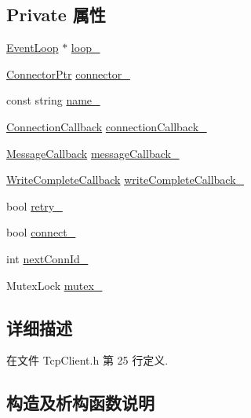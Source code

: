 \subsection*{Private 属性}
\begin{DoxyCompactItemize}
\item 
\hyperlink{classmuduo_1_1net_1_1EventLoop}{Event\+Loop} $\ast$ \hyperlink{classmuduo_1_1net_1_1TcpClient_a19968f50018d32ac31f5cba0195591ac}{loop\+\_\+}
\item 
\hyperlink{namespacemuduo_1_1net_adaac8e7754cfd0ac9c5a680eec411eba}{Connector\+Ptr} \hyperlink{classmuduo_1_1net_1_1TcpClient_afacaad877efe5e2f583f9c03a22166c8}{connector\+\_\+}
\item 
const string \hyperlink{classmuduo_1_1net_1_1TcpClient_a957ab180ea6fccb9f64da8218db44728}{name\+\_\+}
\item 
\hyperlink{namespacemuduo_1_1net_a78754792e997a13cb10908eb7ec508b2}{Connection\+Callback} \hyperlink{classmuduo_1_1net_1_1TcpClient_ae4ac7fea1abbcfb56d481dbe8ffb37e7}{connection\+Callback\+\_\+}
\item 
\hyperlink{namespacemuduo_1_1net_acaa802028467a41738aeb49699e85285}{Message\+Callback} \hyperlink{classmuduo_1_1net_1_1TcpClient_aa4d5ea21d215329779698e634e5e7755}{message\+Callback\+\_\+}
\item 
\hyperlink{namespacemuduo_1_1net_a525c3730bfefb763975b035ebc88a63d}{Write\+Complete\+Callback} \hyperlink{classmuduo_1_1net_1_1TcpClient_a525f0d11cfa2e271600caa30407b6150}{write\+Complete\+Callback\+\_\+}
\item 
bool \hyperlink{classmuduo_1_1net_1_1TcpClient_ae072450f4c07a3dbceed969b99c8df7f}{retry\+\_\+}
\item 
bool \hyperlink{classmuduo_1_1net_1_1TcpClient_ab4b9ce5dfde7fe6c5954a376aac00190}{connect\+\_\+}
\item 
int \hyperlink{classmuduo_1_1net_1_1TcpClient_aab950be51cdd74cb0fc104fa135e4853}{next\+Conn\+Id\+\_\+}
\item 
Mutex\+Lock \hyperlink{classmuduo_1_1net_1_1TcpClient_a6e1bf1809a42f40f1a21178dc6620a6f}{mutex\+\_\+}
\end{DoxyCompactItemize}


\subsection{详细描述}


在文件 Tcp\+Client.\+h 第 25 行定义.



\subsection{构造及析构函数说明}
\mbox{\label{classmuduo_1_1net_1_1TcpClient_aa9f48eab5a57218e8d81d574c961903e}} 

